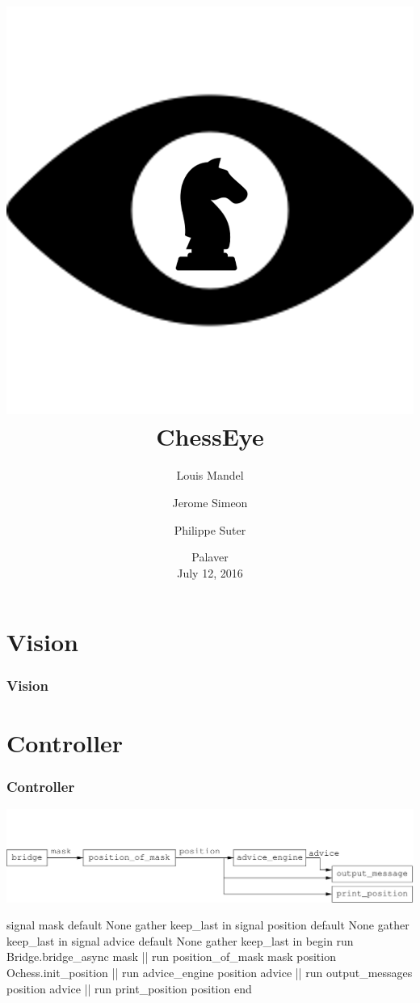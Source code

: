 \documentclass[t]{beamer}
\title{\includegraphics[scale=0.1]{figures/chesseye}
  \\
  ChessEye}
\author{Louis Mandel \and Jerome Simeon \and Philippe Suter}
\date{Palaver \\ July 12, 2016}
\begin{document}

\begin{frame}
  \titlepage
\end{frame}



\section{Vision}

\begin{frame}[fragile]
\frametitle{Vision}


\end{frame}


\section{Controller}

\begin{frame}[fragile]
\frametitle{Controller}

\includegraphics[scale=0.6]{figures/controller}

\pause

\begin{lstrml}
  signal mask default None gather keep_last in
  signal position default None gather keep_last in
  signal advice default None gather keep_last in
  begin
    run Bridge.bridge_async mask ||
    run position_of_mask mask position Ochess.init_position ||
    run advice_engine position advice ||
    run output_messages position advice ||
    run print_position position
  end
\end{lstrml}

\end{frame}
\end{document}
